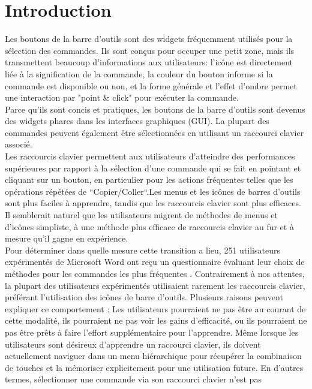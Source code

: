 \documentclass[12pt,a4paper]{article}
\newcommand\tab[1][0.65cm]{\hspace*{#1}}
\begin{document}
\section{Introduction}
Les boutons de la barre d'outils sont des widgets fréquemment utilisés pour la sélection des commandes. Ils sont conçus pour occuper une petit zone, mais ils transmettent beaucoup d'informations aux utilisateurs: l'icône est directement liée à la signification de la commande, la
couleur du bouton informe si la commande est disponible ou non, et la forme générale et l'effet d'ombre permet une interaction par "point \& click" pour exécuter la commande.\\
\tab Parce qu'ils sont concis et pratiques, les boutons de la barre d'outils sont devenus des widgets phares dans les interfaces graphiques (GUI). La plupart des commandes peuvent également être sélectionnées en utilisant un raccourci clavier associé.\\
\tab Les raccourcis clavier permettent aux utilisateurs d'atteindre des performances supérieures par rapport à la sélection d'une commande qui se fait en pointant et cliquant sur un bouton, en particulier pour les actions fréquentes telles que les opérations répétées de “Copier/Coller“.Les menus et les icônes de barres d'outils sont plus faciles à apprendre, tandis que les raccourcis clavier sont plus efficaces. Il semblerait naturel que les utilisateurs migrent de méthodes de menus et d'icônes simpliste, à une méthode plus efficace de raccourcis clavier au fur et à mesure qu’il gagne en expérience.\\
\tab Pour déterminer dans quelle mesure cette transition a lieu, 251 utilisateurs expérimentés de Microsoft Word ont reçu un questionnaire évaluant leur choix de méthodes pour les commandes les
plus fréquentes \cite{1} . Contrairement à nos attentes, la plupart des utilisateurs expérimentés utilisaient
rarement les raccourcis clavier, préférant l'utilisation des icônes de barre d’outils.
Plusieurs raisons peuvent expliquer ce comportement \cite{2}: Les utilisateurs pourraient ne pas être au courant de cette modalité, ils pourraient ne pas voir les gains d'efficacité, ou ils pourraient ne pas
être prêts à faire l'effort supplémentaire pour l'apprendre. Même lorsque les utilisateurs sont désireux d’apprendre un raccourci clavier, ils doivent actuellement naviguer dans un menu hiérarchique pour récupérer la combinaison de touches et la mémoriser explicitement pour une utilisation future. En d'autres termes, sélectionner une commande via son raccourci clavier n'est pas
\end{document}
